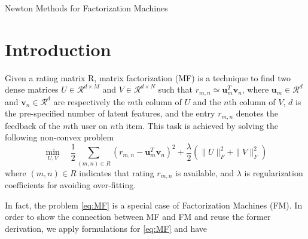 \documentclass[11pt,twoside]{article}
\newcommand{\bsym}[1]{\ensuremath{\boldsymbol{#1}}}
\newcommand{\bu}{\ensuremath{\bsym{u}}}
\newcommand{\bv}{\ensuremath{\bsym{v}}}
\newcommand{\bbr}{\ensuremath{\mathcal R}}
\begin{document}
\begin{center}
    {\Large Newton Methods for Factorization Machines}
\end{center}


\section{Introduction}
Given a rating matrix R,  matrix factorization (MF) is a technique to find two dense matrices $U \in \bbr^{d \times M}$ and $V \in \bbr^{d \times N}$ such that $r_{m,n} \simeq \bu_m^T\bv_n$, where $\bu_m \in \bbr^d$ and $\bv_n \in \bbr^d$ are respectively the $m$th column of $U$ and the $n$th column of $V$, $d$ is the pre-speciﬁed number of latent features, and the entry $r_{m,n}$ denotes the feedback of the $m$th user on $n$th item.  This task is achieved by solving the following non-convex problem
\begin{equation}
    \min_{U,V} \quad \frac{1}{2}\sum_{(m, n) \in R}  (r_{m,n} - \bu_m^T \bv_n)^2+
    \frac{\lambda}{2} (\|U\|^2_F + \|V\|^2_F	)
    \label{eq:MF}
\end{equation}
where $(m, n) \in R$ indicates that rating $r_{m,n}$ is available, and $\lambda$ is regularization coeﬃcients for avoiding over-ﬁtting.

In fact, the problem \eqref{eq:MF} is a special case of Factorization Machines (FM). In order to show the connection between MF and FM and reuse the former derivation, we apply formulations for \eqref{eq:MF} and have
\end{document}

